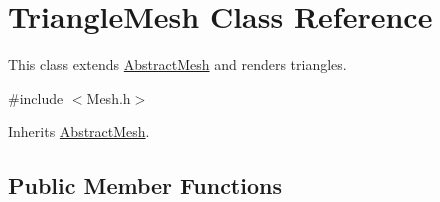 \hypertarget{class_triangle_mesh}{\section{Triangle\-Mesh Class Reference}
\label{class_triangle_mesh}
}


This class extends \hyperlink{class_abstract_mesh}{Abstract\-Mesh} and renders triangles.  




{\ttfamily \#include $<$Mesh.\-h$>$}



Inherits \hyperlink{class_abstract_mesh}{Abstract\-Mesh}.

\subsection*{Public Member Functions}
